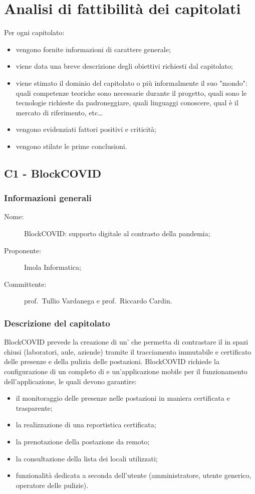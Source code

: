\section{Analisi di fattibilità dei capitolati}
Per ogni capitolato:
\begin{itemize}
	\item vengono fornite informazioni di carattere generale;
	\item viene data una breve descrizione degli obiettivi richiesti dal capitolato;
	\item viene stimato il dominio del capitolato o più informalmente il suo "mondo": quali competenze teoriche sono necessarie durante il progetto, quali sono le tecnologie richieste da padroneggiare, quali linguaggi conoscere, qual è il mercato di riferimento, etc\dots 
	\item vengono evidenziati fattori positivi e criticità;
	\item vengono stilate le prime conclusioni.
\end{itemize}

\subsection{C1 - BlockCOVID}
\subsubsection{Informazioni generali}
\begin{description}
	\item[Nome:] BlockCOVID: supporto digitale al contrasto della pandemia;
	\item[Proponente:] Imola Informatica;
	\item[Committente:] prof.~Tullio Vardanega e prof.~Riccardo Cardin.
\end{description}
\subsubsection{Descrizione del capitolato}
BlockCOVID prevede la creazione di un' che permetta di contrastare il  in spazi chiusi (laboratori, aule, aziende) tramite il tracciamento immutabile e certificato delle presenze e della pulizia delle postazioni.
BlockCOVID richiede la configurazione di un   completo di  e un'applicazione mobile per il funzionamento dell'applicazione, le quali devono garantire:
\begin{itemize}
\item il monitoraggio delle presenze nelle postazioni in maniera certificata e trasparente;
\item la realizzazione di una reportistica certificata;
\item la prenotazione della postazione da remoto;
\item la consultazione della lista dei locali utilizzati;
\item funzionalità dedicata a seconda dell'utente (amministratore, utente generico, operatore delle pulizie).
\end{itemize}
